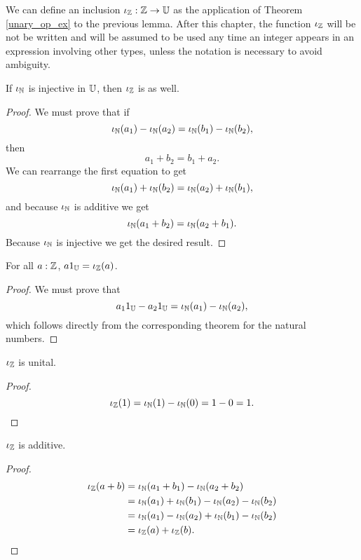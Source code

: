 \documentclass[../../math.tex]{subfiles}
\begin{document}
\begin{definition}
    We can define an inclusion $\iota_{\mathbb{Z}} : \mathbb{Z} \rightarrow \mathbb{U}$ as the application of
    Theorem \ref{unary_op_ex} to the previous lemma.  After this chapter, the
    function $\iota_{\mathbb{Z}}$ will be not be written and will be assumed to be used any
    time an integer appears in an expression involving other types, unless the
    notation is necessary to avoid ambiguity.
\end{definition}

\begin{instance}
    If $\iota_{\mathbb{N}}$ is injective in $\mathbb{U}$, then $\iota_{\mathbb{Z}}$ is as well.
\end{instance}
\begin{proof}
    We must prove that if
    \[
        \iota_{\mathbb{N}}(a_1) - \iota_{\mathbb{N}}(a_2) = \iota_{\mathbb{N}}(b_1) - \iota_{\mathbb{N}}(b_2),
    \]
    then
    \[
        a_1 + b_2 = b_1 + a_2.
    \]
    We can rearrange the first equation to get
    \[
        \iota_{\mathbb{N}}(a_1) + \iota_{\mathbb{N}}(b_2) = \iota_{\mathbb{N}}(a_2) + \iota_{\mathbb{N}}(b_1),
    \]
    and because $\iota_{\mathbb{N}}$ is additive we get
    \[
        \iota_{\mathbb{N}}(a_1 + b_2) = \iota_{\mathbb{N}}(a_2 + b_1).
    \]
    Because $\iota_{\mathbb{N}}$ is injective we get the desired result.
\end{proof}

\begin{theorem}
    For all $a : \mathbb{Z}$, $a1_{\mathbb{U}} = \iota_{\mathbb{Z}}(a)$.
\end{theorem}
\begin{proof}
    We must prove that
    \[
        a_1 1_{\mathbb{U}} - a_2 1_{\mathbb{U}} = \iota_{\mathbb{N}}(a_1) - \iota_{\mathbb{N}}(a_2),
    \]
    which follows directly from the corresponding theorem for the natural
    numbers.
\end{proof}

\begin{instance} \label{from_int_one}
    $\iota_{\mathbb{Z}}$ is unital.
\end{instance}
\begin{proof}
    \[
        \iota_{\mathbb{Z}}(1) = \iota_{\mathbb{N}}(1) - \iota_{\mathbb{N}}(0) = 1 - 0 = 1.
    \]
\end{proof}

\begin{instance} \label{from_int_plus}
    $\iota_{\mathbb{Z}}$ is additive.
\end{instance}
\begin{proof}
    \begin{align*}
        \iota_{\mathbb{Z}}(a + b) &= \iota_{\mathbb{N}}(a_1 + b_1) - \iota_{\mathbb{N}}(a_2 + b_2) \\ &=
        \iota_{\mathbb{N}}(a_1) + \iota_{\mathbb{N}}(b_1) - \iota_{\mathbb{N}}(a_2) - \iota_{\mathbb{N}}(b_2) \\ &=
        \iota_{\mathbb{N}}(a_1) - \iota_{\mathbb{N}}(a_2) + \iota_{\mathbb{N}}(b_1) - \iota_{\mathbb{N}}(b_2) \\ &=
        \iota_{\mathbb{Z}}(a) + \iota_{\mathbb{Z}}(b).
    \end{align*}
\end{proof}
\end{document}
